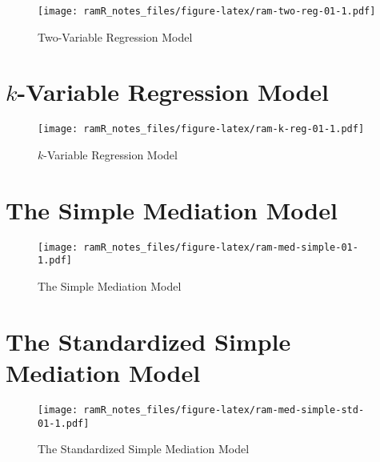 \documentclass[
]{book}
\theoremstyle{definition}
\theoremstyle{definition}
\theoremstyle{definition}
\theoremstyle{remark}
\begin{document}
\begin{figure}
\centering
\texttt{[image: ramR\_notes\_files/figure-latex/ram-two-reg-01-1.pdf]}
\caption{\label{fig:ram-two-reg-01}Two-Variable Regression Model}
\end{figure}

\hypertarget{ram-k-reg}{%
\chapter{\texorpdfstring{\(k\)-Variable Regression Model}{k-Variable Regression Model}}\label{ram-k-reg}}

\begin{figure}
\centering
\texttt{[image: ramR\_notes\_files/figure-latex/ram-k-reg-01-1.pdf]}
\caption{\label{fig:ram-k-reg-01}\(k\)-Variable Regression Model}
\end{figure}

\hypertarget{ram-med-simple}{%
\chapter{The Simple Mediation Model}\label{ram-med-simple}}

\begin{figure}
\centering
\texttt{[image: ramR\_notes\_files/figure-latex/ram-med-simple-01-1.pdf]}
\caption{\label{fig:ram-med-simple-01}The Simple Mediation Model}
\end{figure}

\hypertarget{ram-med-simple-std}{%
\chapter{The Standardized Simple Mediation Model}\label{ram-med-simple-std}}

\begin{figure}
\centering
\texttt{[image: ramR\_notes\_files/figure-latex/ram-med-simple-std-01-1.pdf]}
\caption{\label{fig:ram-med-simple-std-01}The Standardized Simple Mediation Model}
\end{figure}

  
\end{document}
